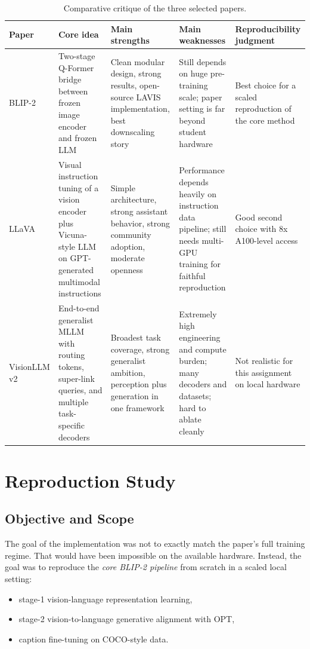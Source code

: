 \documentclass[11pt]{article}
\begin{document}
\begin{table}[t]
\centering
\small
\begin{tabularx}{\textwidth}{p{2.2cm} Y Y Y Y}
\toprule
Paper & Core idea & Main strengths & Main weaknesses & Reproducibility judgment \\
\midrule
BLIP-2 & Two-stage Q-Former bridge between frozen image encoder and frozen LLM & Clean modular design, strong results, open-source LAVIS implementation, best downscaling story & Still depends on huge pre-training scale; paper setting is far beyond student hardware & Best choice for a scaled reproduction of the core method \\
LLaVA & Visual instruction tuning of a vision encoder plus Vicuna-style LLM on GPT-generated multimodal instructions & Simple architecture, strong assistant behavior, strong community adoption, moderate openness & Performance depends heavily on instruction data pipeline; still needs multi-GPU training for faithful reproduction & Good second choice with 8x A100-level access \\
VisionLLM v2 & End-to-end generalist MLLM with routing tokens, super-link queries, and multiple task-specific decoders & Broadest task coverage, strong generalist ambition, perception plus generation in one framework & Extremely high engineering and compute burden; many decoders and datasets; hard to ablate cleanly & Not realistic for this assignment on local hardware \\
\bottomrule
\end{tabularx}
\caption{Comparative critique of the three selected papers.}
\label{tab:critique}
\end{table}

\section{Reproduction Study}
\subsection{Objective and Scope}
The goal of the implementation was not to exactly match the paper's full training regime. That would have been impossible on the available hardware. Instead, the goal was to reproduce the \emph{core BLIP-2 pipeline} from scratch in a scaled local setting:
\begin{itemize}
\item stage-1 vision-language representation learning,
\item stage-2 vision-to-language generative alignment with OPT,
\item caption fine-tuning on COCO-style data.
\end{itemize}
\end{document}
